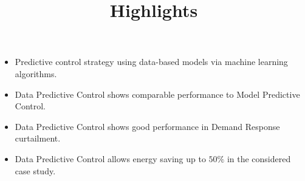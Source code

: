 \documentclass[12pt]{article}
\begin{document}
\title{Highlights}
\date{}
\maketitle 
\thispagestyle{empty}

\begin{itemize}
	\item Predictive control strategy using data-based models via machine learning algorithms.
	\item Data Predictive Control shows comparable performance to Model Predictive Control.
	\item Data Predictive Control shows good performance in Demand Response curtailment.
	\item Data Predictive Control allows energy saving up to $50\%$ in the considered case study.
\end{itemize}
\end{document}
